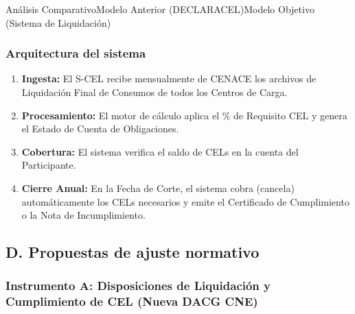 \documentclass{cel}
\begin{document}
\vspace{0.3cm}
\begin{tablaParadigmaV2}{Análisis Comparativo}{Modelo Anterior (DECLARACEL)}{Modelo Objetivo (Sistema de Liquidación)}
\end{tablaParadigmaV2}

\subsubsection{Arquitectura del sistema}
\nopagebreak

\begin{enumerate}
\item \textbf{Ingesta:} El S-CEL recibe mensualmente de CENACE los archivos de \textquotedbl{}Liquidación Final de Consumos\textquotedbl{} de todos los Centros de Carga.
\item \textbf{Procesamiento:} El motor de cálculo aplica el \% de Requisito CEL y genera el \textquotedbl{}Estado de Cuenta de Obligaciones\textquotedbl{}.
\item \textbf{Cobertura:} El sistema verifica el saldo de CELs en la cuenta del Participante.
\item \textbf{Cierre Anual:} En la Fecha de Corte, el sistema \textquotedbl{}cobra\textquotedbl{} (cancela) automáticamente los CELs necesarios y emite el Certificado de Cumplimiento o la Nota de Incumplimiento.

\end{enumerate}
\subsection{D. Propuestas de ajuste normativo}
\nopagebreak

\subsubsection{Instrumento A: Disposiciones de Liquidación y Cumplimiento de CEL (Nueva DACG CNE)}
\nopagebreak
\end{document}
